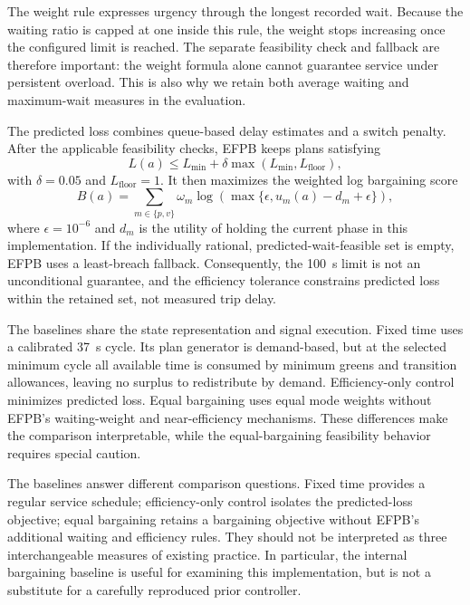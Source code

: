 \documentclass[sigconf]{acmart}
\begin{document}
The weight rule expresses urgency through the longest recorded
wait. Because the waiting ratio is capped at one inside this rule,
the weight stops increasing once the configured limit is reached.
The separate feasibility check and fallback are therefore important:
the weight formula alone cannot guarantee service under persistent
overload. This is also why we retain both average waiting and
maximum-wait measures in the evaluation.

The predicted loss combines queue-based delay estimates and a
switch penalty. After the applicable feasibility checks, EFPB keeps
plans satisfying
\begin{equation}
L(a)\leq L_{\min}+\delta\max(L_{\min},L_{\mathrm{floor}}),
\end{equation}
with $\delta=0.05$ and $L_{\mathrm{floor}}=1$. It then maximizes
the weighted log bargaining score
\begin{equation}
B(a)=\sum_{m\in\{p,v\}}\omega_m
\log\!\left(\max\{\epsilon,u_m(a)-d_m+\epsilon\}\right),
\end{equation}
where $\epsilon=10^{-6}$ and $d_m$ is the utility of holding the
current phase in this implementation. If the individually rational,
predicted-wait-feasible set is empty, EFPB uses a least-breach
fallback. Consequently, the 100~s limit is not an unconditional
guarantee, and the efficiency tolerance constrains predicted loss
within the retained set, not measured trip delay.

The baselines share the state representation and signal execution.
Fixed time uses a calibrated 37~s cycle. Its plan generator is
demand-based, but at the selected minimum cycle all available time
is consumed by minimum greens and transition allowances, leaving
no surplus to redistribute by demand. Efficiency-only control
minimizes predicted loss. Equal bargaining uses equal mode weights
without EFPB's waiting-weight and near-efficiency mechanisms.
These differences make the comparison interpretable, while the
equal-bargaining feasibility behavior requires special caution.

The baselines answer different comparison questions. Fixed time
provides a regular service schedule; efficiency-only control isolates
the predicted-loss objective; equal bargaining retains a bargaining
objective without EFPB's additional waiting and efficiency rules.
They should not be interpreted as three interchangeable measures of
existing practice. In particular, the internal bargaining baseline is
useful for examining this implementation, but is not a substitute for
a carefully reproduced prior controller.
\end{document}
